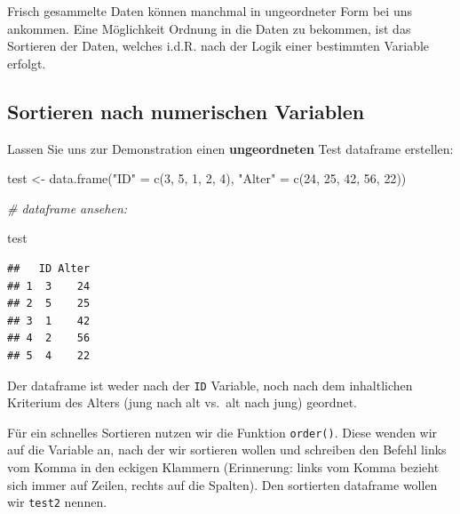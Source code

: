 \documentclass[
]{book}
\newenvironment{Shaded}{\begin{snugshade}}{\end{snugshade}}
\newcommand{\CommentTok}[1]{\textcolor[rgb]{0.56,0.35,0.01}{\textit{#1}}}
\newcommand{\DecValTok}[1]{\textcolor[rgb]{0.00,0.00,0.81}{#1}}
\newcommand{\FunctionTok}[1]{\textcolor[rgb]{0.00,0.00,0.00}{#1}}
\newcommand{\NormalTok}[1]{#1}
\newcommand{\OtherTok}[1]{\textcolor[rgb]{0.56,0.35,0.01}{#1}}
\newcommand{\SpecialCharTok}[1]{\textcolor[rgb]{0.00,0.00,0.00}{#1}}
\newcommand{\StringTok}[1]{\textcolor[rgb]{0.31,0.60,0.02}{#1}}
\begin{document}
Frisch gesammelte Daten können manchmal in ungeordneter Form bei uns ankommen. Eine Möglichkeit Ordnung in die Daten zu bekommen, ist das Sortieren der Daten, welches i.d.R. nach der Logik einer bestimmten Variable erfolgt.

\hypertarget{sortieren-nach-numerischen-variablen}{%
\subsection{Sortieren nach numerischen Variablen}\label{sortieren-nach-numerischen-variablen}}

Lassen Sie uns zur Demonstration einen \textbf{ungeordneten} Test dataframe erstellen:

\begin{Shaded}
\begin{Highlighting}[]
\NormalTok{test }\OtherTok{\textless{}{-}} \FunctionTok{data.frame}\NormalTok{(}\StringTok{"ID"} \OtherTok{=} \FunctionTok{c}\NormalTok{(}\DecValTok{3}\NormalTok{, }\DecValTok{5}\NormalTok{, }\DecValTok{1}\NormalTok{, }\DecValTok{2}\NormalTok{, }\DecValTok{4}\NormalTok{),}
                     \StringTok{"Alter"} \OtherTok{=} \FunctionTok{c}\NormalTok{(}\DecValTok{24}\NormalTok{, }\DecValTok{25}\NormalTok{, }\DecValTok{42}\NormalTok{, }\DecValTok{56}\NormalTok{, }\DecValTok{22}\NormalTok{))}

\CommentTok{\# dataframe ansehen:}

\NormalTok{test}
\end{Highlighting}
\end{Shaded}

\begin{verbatim}
##   ID Alter
## 1  3    24
## 2  5    25
## 3  1    42
## 4  2    56
## 5  4    22
\end{verbatim}

Der dataframe ist weder nach der \texttt{ID} Variable, noch nach dem inhaltlichen Kriterium des Alters (jung nach alt vs.~alt nach jung) geordnet.

Für ein schnelles Sortieren nutzen wir die Funktion \texttt{order()}. Diese wenden wir auf die Variable an, nach der wir sortieren wollen und schreiben den Befehl links vom Komma in den eckigen Klammern (Erinnerung: links vom Komma bezieht sich immer auf Zeilen, rechts auf die Spalten). Den sortierten dataframe wollen wir \texttt{test2} nennen.

\begin{Shaded}
\end{Shaded}
\end{document}
